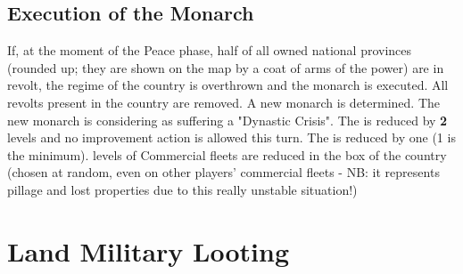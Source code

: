 \subsection{Execution of the
  Monarch}\label{chRedep:ExecutionMonarchByRevolts}
\aparag If, at the moment of the Peace phase, half of all owned national
provinces (rounded up; they are shown on the map by a coat of arms of the
power) are in revolt, the regime of the country is overthrown and the monarch
is executed.
\aparag[Consequences]
All revolts present in the country are removed. A new monarch is
determined. The new monarch is considering as suffering a "Dynastic Crisis".
\bparag The \STAB is reduced by \textbf{2} levels%
and no \STAB improvement action is allowed this turn.
\bparag The \DTI is reduced by one (1 is the minimum).
 levels of Commercial fleets are reduced in the \CTZ box of the
country (chosen at random, even on other players' commercial fleets - NB: it
represents pillage and lost properties due to this really unstable situation!)



\section{Land Military Looting}

